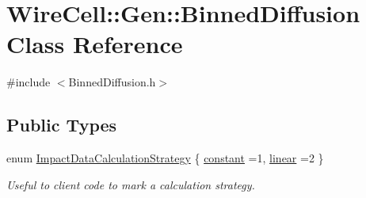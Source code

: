 \hypertarget{class_wire_cell_1_1_gen_1_1_binned_diffusion}{}\section{Wire\+Cell\+:\+:Gen\+:\+:Binned\+Diffusion Class Reference}
\label{class_wire_cell_1_1_gen_1_1_binned_diffusion}


{\ttfamily \#include $<$Binned\+Diffusion.\+h$>$}

\subsection*{Public Types}
\begin{DoxyCompactItemize}
\item 
enum \hyperlink{class_wire_cell_1_1_gen_1_1_binned_diffusion_a96d624fc75e70453e7e29c381850d218}{Impact\+Data\+Calculation\+Strategy} \{ \hyperlink{class_wire_cell_1_1_gen_1_1_binned_diffusion_a96d624fc75e70453e7e29c381850d218af1fd031b5265321e1bb2520047f87006}{constant} =1, 
\hyperlink{class_wire_cell_1_1_gen_1_1_binned_diffusion_a96d624fc75e70453e7e29c381850d218a6079f954d643f93c2c08d58967c21e0e}{linear} =2
 \}\begin{DoxyCompactList}\small\item\em Useful to client code to mark a calculation strategy. \end{DoxyCompactList}
\end{DoxyCompactItemize}
